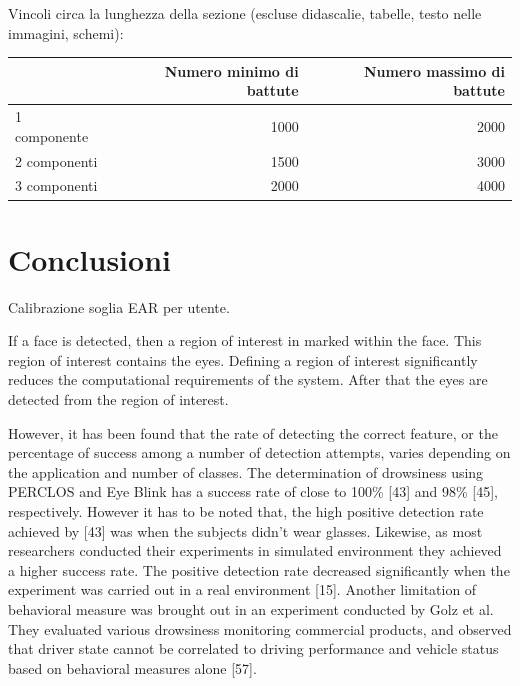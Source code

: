 \documentclass[12pt]{article}
\begin{document}
Vincoli circa la lunghezza della sezione (escluse didascalie, tabelle, testo nelle immagini, schemi):

\vspace{1cm}
\begin{tabular}{l|rr}
 & Numero minimo di battute & Numero massimo di battute \\
 \hline
 1 componente & 1000 & 2000 \\
 2 componenti & 1500 & 3000 \\
 3 componenti & 2000 & 4000 \\
 \hline
\end{tabular}

\newpage



\section{Conclusioni}

Calibrazione soglia EAR per utente.

If a face is detected, then a region of interest in marked within the face. This region of interest contains the eyes. Defining a region of interest significantly reduces the computational requirements of the system. After that the eyes are detected from the region of interest.

However, it has been found that the rate of detecting the correct feature, or the percentage of success among a number of detection attempts, varies depending on the application and number of classes. The determination of drowsiness using PERCLOS and Eye Blink has a success rate of close to 100\% [43] and 98\% [45], respectively. However it has to be noted that, the high positive detection rate achieved by [43] was when the subjects didn’t wear glasses. Likewise, as most researchers conducted their experiments in simulated environment they achieved a higher success rate. The positive detection rate decreased significantly when the experiment was carried out in a real environment [15].
Another limitation of behavioral measure was brought out in an experiment conducted by Golz et al. They evaluated various drowsiness monitoring commercial products, and observed that driver state cannot be correlated to driving performance and vehicle status based on behavioral measures alone [57].
\end{document}
